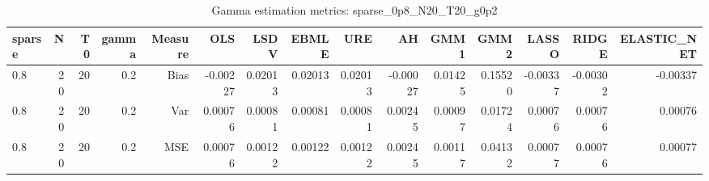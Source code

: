 \begin{table}[!htbp]\centering
\caption{Gamma estimation metrics: sparse_0p8_N20_T20_g0p2}
\label{tab:table1_sparse_0p8_N20_T20_g0p2}
\begin{tabular}{lrrrrrrrrrrrrrr}
\hline
sparse & N & T0 & gamma & Measure & OLS & LSDV & EBMLE & URE & AH & GMM1 & GMM2 & LASSO & RIDGE & ELASTIC_NET \\
\hline
0.8 & 20 & 20 & 0.2 & Bias & -0.00227 & 0.02013 & 0.02013 & 0.02013 & -0.00027 & 0.01425 & 0.15520 & -0.00337 & -0.00302 & -0.00337 \\
0.8 & 20 & 20 & 0.2 & Var & 0.00076 & 0.00081 & 0.00081 & 0.00081 & 0.00245 & 0.00097 & 0.01724 & 0.00076 & 0.00076 & 0.00076 \\
0.8 & 20 & 20 & 0.2 & MSE & 0.00076 & 0.00122 & 0.00122 & 0.00122 & 0.00245 & 0.00117 & 0.04132 & 0.00077 & 0.00076 & 0.00077 \\
\hline
\end{tabular}
\end{table}

